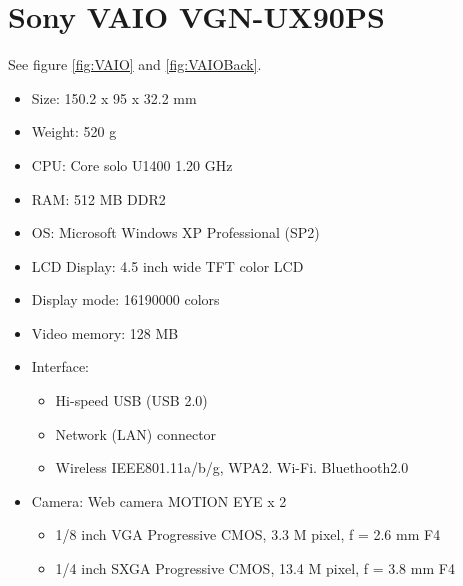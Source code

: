 \chapter{Sony VAIO VGN-UX90PS}
\label{AppendixVAIO}

See figure \ref{fig:VAIO} and \ref{fig:VAIOBack}.

\begin{itemize}
	\item Size: 150.2 x 95 x 32.2 mm
	\item Weight: 520 g
	\item CPU: Core solo U1400 1.20 GHz
	\item RAM: 512 MB DDR2
	\item OS: Microsoft Windows XP Professional (SP2)
	\item LCD Display: 4.5 inch wide TFT color LCD
	\item Display mode: 16190000 colors
	\item Video memory: 128 MB
	\item Interface:
		\begin{itemize}
			\item Hi-speed USB (USB 2.0)
			\item Network (LAN) connector
			\item Wireless IEEE801.11a/b/g, WPA2. Wi-Fi. Bluethooth2.0
		\end{itemize}
	\item Camera: Web camera MOTION EYE x 2
		\begin{itemize}
			\item 1/8 inch VGA Progressive CMOS, 3.3 M pixel, f = 2.6 mm F4
			\item 1/4 inch SXGA Progressive CMOS, 13.4 M pixel, f = 3.8 mm F4
		\end{itemize}
\end{itemize}

